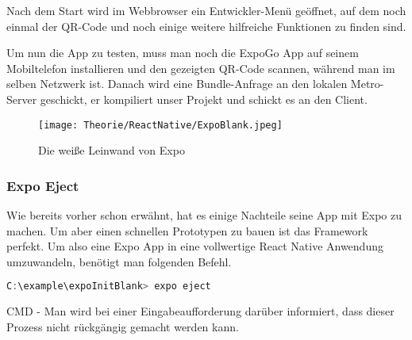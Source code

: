 Nach dem Start wird im Webbrowser ein Entwickler-Menü geöffnet, auf dem noch einmal der QR-Code
und noch einige weitere hilfreiche Funktionen zu finden sind.

Um nun die App zu testen, muss man noch die ExpoGo App auf seinem Mobiltelefon installieren und den
gezeigten QR-Code scannen, während man im selben Netzwerk ist. Danach wird eine Bundle-Anfrage an
den lokalen Metro-Server geschickt, er kompiliert unser Projekt und schickt es an den Client.

\begin{figure}[H]
  \begin{center}
    \texttt{[image: Theorie/ReactNative/ExpoBlank.jpeg]}
    \caption{Die weiße Leinwand von Expo}
  \end{center}
\end{figure}

\subsubsection{Expo Eject}
Wie bereits vorher schon erwähnt, hat es einige Nachteile seine App mit Expo zu machen. Um aber
einen schnellen Prototypen zu bauen ist das Framework perfekt. Um also eine Expo App in eine
vollwertige React Native Anwendung umzuwandeln, benötigt man folgenden Befehl.

\begin{code}[htp]
\begin{lstlisting}[firstnumber=1,language=JavaScript, style=CMD]
C:\example\expoInitBlank> expo eject
\end{lstlisting}
\caption{CMD - Man wird bei einer Eingabeaufforderung darüber informiert, dass dieser Prozess nicht rückgängig
gemacht werden kann.}
\end{code}
